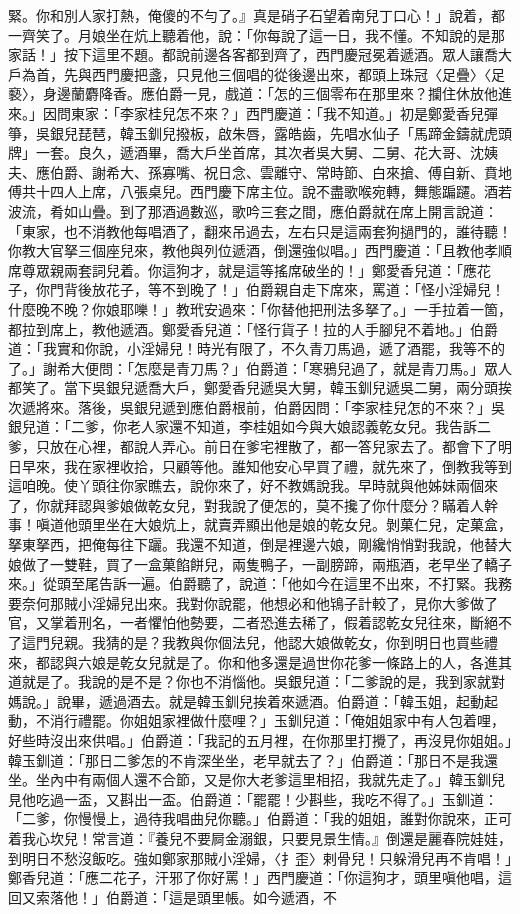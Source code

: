緊。你和別人家打熱，俺傻的不勻了。』真是硝子石望着南兒丁口心！」說着，都一齊笑了。月娘坐在炕上聽着他，說：「你每說了這一日，我不懂。不知說的是那家話！」按下這里不題。都說前邊各客都到齊了，西門慶冠冕着遞酒。眾人讓喬大戶為首，先與西門慶把盞，只見他三個唱的從後邊出來，都頭上珠冠〈足疊〉〈足褻〉，身邊蘭麝降香。應伯爵一見，戲道：「怎的三個零布在那里來？攔住休放他進來。」因問東家：「李家桂兒怎不來？」西門慶道：「我不知道。」初是鄭愛香兒彈箏，吳銀兒琵琶，韓玉釧兒撥板，啟朱唇，露皓齒，先唱水仙子「馬蹄金鑄就虎頭牌」一套。良久，遞酒畢，喬大戶坐首席，其次者吳大舅、二舅、花大哥、沈姨夫、應伯爵、謝希大、孫寡嘴、祝日念、雲離守、常時節、白來搶、傅自新、賁地傅共十四人上席，八張桌兒。西門慶下席主位。說不盡歌喉宛轉，舞態蹁躚。酒若波流，肴如山疊。到了那酒過數巡，歌吟三套之間，應伯爵就在席上開言說道：「東家，也不消教他每唱酒了，翻來吊過去，左右只是這兩套狗撾門的，誰待聽！你教大官拏三個座兒來，教他與列位遞酒，倒還強似唱。」西門慶道：「且教他孝順席尊眾親兩套詞兒着。你這狗才，就是這等搖席破坐的！」鄭愛香兒道：「應花子，你門背後放花子，等不到晚了！」伯爵親自走下席來，罵道：「怪小淫婦兒！什麼晚不晚？你娘耶嚛！」教玳安過來：「你替他把刑法多拏了。」一手拉着一箇，都拉到席上，教他遞酒。鄭愛香兒道：「怪行貨子！拉的人手腳兒不着地。」伯爵道：「我實和你說，小淫婦兒！時光有限了，不久青刀馬過，遞了酒罷，我等不的了。」謝希大便問：「怎麼是青刀馬？」伯爵道：「寒鴉兒過了，就是青刀馬。」眾人都笑了。當下吳銀兒遞喬大戶，鄭愛香兒遞吳大舅，韓玉釧兒遞吳二舅，兩分頭挨次遞將來。落後，吳銀兒遞到應伯爵根前，伯爵因問：「李家桂兒怎的不來？」吳銀兒道：「二爹，你老人家還不知道，李桂姐如今與大娘認義乾女兒。我告訴二爹，只放在心裡，都說人弄心。前日在爹宅裡散了，都一答兒家去了。都會下了明日早來，我在家裡收拾，只顧等他。誰知他安心早買了禮，就先來了，倒教我等到這咱晚。使丫頭往你家瞧去，說你來了，好不教媽說我。早時就與他姊妹兩個來了，你就拜認與爹娘做乾女兒，對我說了便怎的，莫不攙了你什麼分？瞞着人幹事！嗔道他頭里坐在大娘炕上，就賣弄顯出他是娘的乾女兒。剝菓仁兒，定菓盒，拏東拏西，把俺每往下躧。我還不知道，倒是裡邊六娘，剛纔悄悄對我說，他替大娘做了一雙鞋，買了一盒菓餡餅兒，兩隻鴨子，一副膀蹄，兩瓶酒，老早坐了轎子來。」從頭至尾告訴一遍。伯爵聽了，說道：「他如今在這里不出來，不打緊。我務要奈何那賊小淫婦兒出來。我對你說罷，他想必和他鴇子計較了，見你大爹做了官，又掌着刑名，一者懼怕他勢要，二者恐進去稀了，假着認乾女兒往來，斷絕不了這門兒親。我猜的是？我教與你個法兒，他認大娘做乾女，你到明日也買些禮來，都認與六娘是乾女兒就是了。你和他多還是過世你花爹一條路上的人，各進其道就是了。我說的是不是？你也不消惱他。吳銀兒道：「二爹說的是，我到家就對媽說。」說畢，遞過酒去。就是韓玉釧兒挨着來遞酒。伯爵道：「韓玉姐，起動起動，不消行禮罷。你姐姐家裡做什麼哩？」玉釧兒道：「俺姐姐家中有人包着哩，好些時沒出來供唱。」伯爵道：「我記的五月裡，在你那里打攪了，再沒見你姐姐。」韓玉釧道：「那日二爹怎的不肯深坐坐，老早就去了？」伯爵道：「那日不是我還坐。坐內中有兩個人還不合節，又是你大老爹這里相招，我就先走了。」韓玉釧兒見他吃過一盃，又斟出一盃。伯爵道：「罷罷！少斟些，我吃不得了。」玉釧道：「二爹，你慢慢上，過待我唱曲兒你聽。」伯爵道：「我的姐姐，誰對你說來，正可着我心坎兒！常言道：『養兒不要屙金溺銀，只要見景生情。』倒還是麗春院娃娃，到明日不愁沒飯吃。強如鄭家那賊小淫婦，〈扌歪〉剌骨兒！只躲滑兒再不肯唱！」鄭香兒道：「應二花子，汗邪了你好罵！」西門慶道：「你這狗才，頭里嗔他唱，這回又索落他！」伯爵道：「這是頭里帳。如今遞酒，不